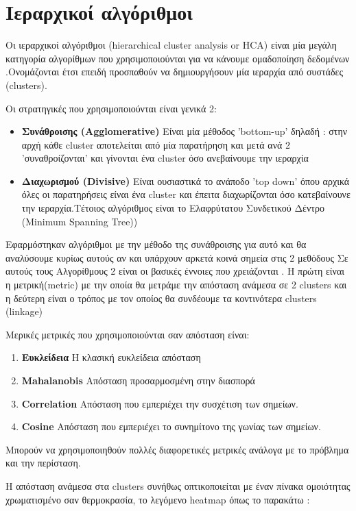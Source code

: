 \section{Ιεραρχικοί αλγόριθμοι}
Οι ιεραρχικοί αλγόριθμοι (hierarchical cluster analysis or HCA) είναι μία μεγάλη κατηγορία αλγορίθμων που χρησιμοποιούνται για να κάνουμε ομαδοποίηση δεδομένων .Ονομάζονται έτσι επειδή προσπαθούν να δημιουργήσουν μία ιεραρχία από συστάδες (clusters).

Οι στρατηγικές που χρησιμοποιούνται είναι γενικά 2:
\begin{itemize}
\item{ \textbf{Συνάθροισης (Agglomerative)} Είναι μία μέθοδος 'bottom-up' δηλαδή : στην αρχή κάθε cluster αποτελείται από μία παρατήρηση και μετά ανά 2 'συναθροίζονται' και γίνονται ένα cluster όσο ανεβαίνουμε την ιεραρχία  }
\item{}\textbf{Διαχωρισμού (Divisive)} Είναι ουσιαστικά το ανάποδο 'top down' όπου αρχικά όλες οι παρατηρήσεις είναι ένα cluster και έπειτα διαχωρίζονται όσο κατεβαίνουνε την ιεραρχία.Τέτοιος αλγόριθμος είναι το Ελαφρύτατου Συνδετικού Δέντρο (Minimum Spanning Tree))
\end{itemize}

Εφαρμόστηκαν αλγόριθμοι με την μέθοδο της συνάθροισης για αυτό και θα αναλύσουμε κυρίως   αυτούς αν και υπάρχουν αρκετά κοινά σημεία στις 2 μεθόδους
Σε αυτούς τους Αλγορίθμους 2 είναι οι βασικές έννοιες που χρειάζονται .
Η πρώτη είναι η μετρική(metric) με την οποία θα μετράμε την απόσταση ανάμεσα σε 2 clusters και η δεύτερη είναι ο τρόπος με τον οποίος θα συνδέουμε τα κοντινότερα clusters (linkage)

Μερικές μετρικές που χρησιμοποιούνται σαν απόσταση είναι:
\begin{enumerate}
   \item \textbf{Ευκλείδεια }H κλασική ευκλείδεια απόσταση
\item \textbf{Mahalanobis }Απόσταση προσαρμοσμένη στην διασπορά
\item \textbf{Correlation }Απόσταση που εμπεριέχει την συσχέτιση των σημείων.
\item \textbf{Cosine }Απόσταση που εμπεριέχει το συνημίτονο της γωνίας των σημείων.
\end{enumerate}
Μπορούν να χρησιμοποιηθούν πολλές διαφορετικές μετρικές ανάλογα με το πρόβλημα και την περίσταση.

\noindent\begin{minipage}{\linewidth}
\centering
{}
H απόσταση ανάμεσα στα   clusters  συνήθως οπτικοποιείται με έναν πίνακα ομοιότητας χρωματισμένο σαν θερμοκρασία, το λεγόμενο heatmap  όπως το παρακάτω :
    \label{fig:heat1}
\end{minipage}


